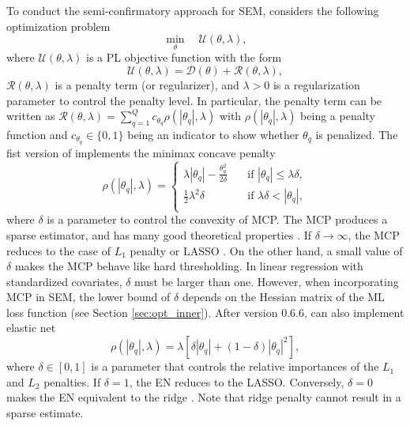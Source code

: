 \documentclass[nojss]{jss}
\begin{document}
To conduct the semi-confirmatory approach for SEM,  considers the following optimization problem
%
\begin{equation} \label{eq:pl_problem}
\min_{\theta} \quad \mathcal{U}(\theta,\lambda),
\end{equation}
%
where $\mathcal{U}(\theta,\lambda)$ is a PL objective function with the form
%
\begin{equation} \label{eq:pl_criterion}
\mathcal{U}(\theta,\lambda) = \mathcal{D}(\theta) + \mathcal{R}(\theta,\lambda),
\end{equation}
%
$\mathcal{R}(\theta,\lambda)$ is a penalty term (or regularizer), and $\lambda>0$ is a regularization parameter to control the penalty level. In particular, the penalty term can be written as $\mathcal{R}(\theta,\lambda) = \sum_{q=1}^Q c_{\theta_q} \rho(|\theta_q|, \lambda)$ with $\rho(|\theta_q|, \lambda)$ being a penalty function and $c_{\theta_q} \in \{0,1\} $ being an indicator to show whether $\theta_q$ is penalized. The fist version of  implements the minimax concave penalty \citep[MCP;][]{Zhang2010}
%
\begin{equation} \label{eq:mcp}
\rho(|\theta_q|, \lambda) =
  \begin{cases}
    \lambda |\theta_q| - \frac{\theta_q^2}{2\delta}  & \quad \text{if } |\theta_q| \leq \lambda \delta,\\
    \frac{1}{2} \lambda^2 \delta  & \quad \text{if } \lambda \delta <|\theta_q|, \\
  \end{cases}
\end{equation}
%
where $\delta$ is a parameter to control the convexity of MCP. The MCP produces a sparse estimator, and has many good theoretical properties \citep[see][]{Mazumder2011, Zhang2010}. If $\delta \rightarrow \infty$, the MCP reduces to the case of $L_1$ penalty or LASSO \citep[least absolute shrinkage and selection operator;][]{Tibshirani1996}. On the other hand, a small value of $\delta$ makes the MCP behave like hard thresholding. In linear regression with standardized covariates, $\delta$ must be larger than one. However, when incorporating MCP in SEM, the lower bound of $\delta$ depends on the Hessian matrix of the ML loss function (see Section \ref{sec:opt_inner}). After version 0.6.6,  can also implement elastic net \citep[EN;][]{zou2005}
\begin{equation} \label{eq:en}
\rho(|\theta_q|, \lambda) = \lambda \left[ \delta|\theta_q| + (1-\delta) |\theta_q|^2 \right],
\end{equation}
where $\delta \in [0,1]$ is a parameter that controls the relative importances of the $L_1$ and $L_2$ penalties. If $\delta = 1$, the EN reduces to the LASSO. Conversely, $\delta = 0$ makes the EN equivalent to the ridge \citep[][]{Hoerl1970}. Note that ridge penalty cannot result in a sparse estimate.
\end{document}

